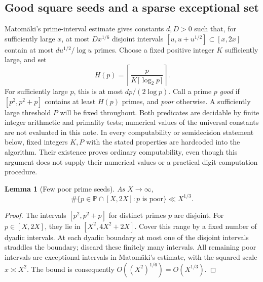 \documentclass[11pt,a4paper]{article}
\newtheorem{lemma}[theorem]{Lemma}
\theoremstyle{definition}
\theoremstyle{remark}
\numberwithin{equation}{section}
\begin{document}
\subsection{Good square seeds and a sparse exceptional set}

Matom\"aki's prime-interval estimate \cite[Lemma~9]{Matomaki2010} gives
constants $d,D>0$ such that,
for sufficiently large $x$, at most $Dx^{1/6}$ disjoint intervals
$[u,u+u^{1/2}]\subset[x,2x]$ contain at most
$d u^{1/2}/\log u$ primes. Choose a fixed positive integer $K$ sufficiently
large, and set
\[
 H(p)=\left\lceil\frac{p}{K\lceil\log_2 p\rceil}\right\rceil.
\]
For sufficiently large $p$, this is at most $dp/(2\log p)$.
Call a prime $p$ \emph{good} if $[p^2,p^2+p]$ contains at least $H(p)$
primes, and \emph{poor} otherwise. A sufficiently large threshold $P$
will be fixed throughout. Both predicates are decidable by finite integer
arithmetic and primality tests; numerical values of the universal
constants are not evaluated in this note. In every computability or
semidecision statement below, fixed integers $K,P$ with the stated
properties are hardcoded into the algorithm. Their existence proves
ordinary computability, even though this argument does not supply their
numerical values or a practical digit-computation procedure.

\begin{lemma}[Few poor prime seeds]\label{f13:sqnew:poorcount}
As $X\to\infty$,
\[
 \#\{p\in\mathbb P\cap[X,2X]:p\text{ is poor}\}\ll X^{1/3}.
\]
\end{lemma}
\begin{proof}
The intervals $[p^2,p^2+p]$ for distinct primes $p$ are disjoint. For
$p\in[X,2X]$, they lie in $[X^2,4X^2+2X]$. Cover this range by a fixed
number of dyadic intervals. At each dyadic boundary at most one of the
disjoint intervals straddles the boundary; discard these finitely many
intervals. All remaining poor intervals are exceptional intervals in
Matom\"aki's estimate, with the squared scale $x\asymp X^2$.
The bound is consequently $O((X^2)^{1/6})=O(X^{1/3})$.
\end{proof}
\end{document}
